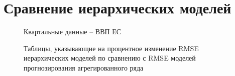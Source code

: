 \documentclass[12pt,a4paper, oneside]{extreport}
\begin{document}
\chapter[Сравнение иерархических моделей]{Сравнение иерархических моделей}\label{app-b}


\begin{figure}[H]
	\caption{Таблицы, указывающие на процентное изменение RMSE иерархических моделей по сравнению с RMSE моделей прогнозирования  агрегированного ряда   }
	\label{otkl_1}
	
	\centering\footnotesize{Квартальные данные -- ВВП ЕС  }
	
	\begin{minipage}[H]{0.4\linewidth}
	\end{minipage}
		\hfill
	\begin{minipage}[H]{0.4\linewidth}
\end{minipage}
\end{figure}
\end{document}
